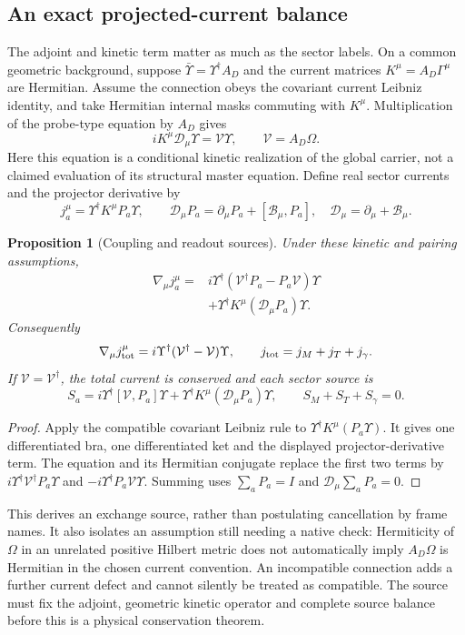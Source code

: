 \documentclass[11pt,a4paper]{article}
\newtheorem{proposition}{Proposition}
\begin{document}
\subsection{An exact projected-current balance}
The adjoint and kinetic term matter as much as the sector labels. On a
common geometric background, suppose
$\bar\Upsilon=\Upsilon^\dagger A_D$ and the current matrices
$K^\mu=A_D\Gamma^\mu$ are Hermitian. Assume the connection obeys the
covariant current Leibniz identity, and take Hermitian internal masks
commuting with $K^\mu$. Multiplication of the probe-type equation by
$A_D$ gives
\[
 iK^\mu\mathcal D_\mu\Upsilon=\mathcal V\Upsilon,
 \qquad \mathcal V=A_D\Omega.
\]
Here this equation is a conditional kinetic realization of the global
carrier, not a claimed evaluation of its structural master equation.
Define real sector currents and the projector derivative by
\[
 j_a^\mu=\Upsilon^\dagger K^\mu P_a\Upsilon,\qquad
 \mathcal D_\mu P_a=\partial_\mu P_a+[\mathcal B_\mu,P_a],
 \quad\mathcal D_\mu=\partial_\mu+\mathcal B_\mu.
\]

\begin{proposition}[Coupling and readout sources]
Under these kinetic and pairing assumptions,
\[
 \begin{aligned}
 \nabla_\mu j_a^\mu={}&
 i\Upsilon^\dagger(\mathcal V^\dagger P_a-P_a\mathcal V)\Upsilon\\
 &+\Upsilon^\dagger K^\mu(\mathcal D_\mu P_a)\Upsilon.
 \end{aligned}
\]
Consequently
\[
 \nabla_\mu j_{\rm tot}^\mu
 =i\Upsilon^\dagger(\mathcal V^\dagger-\mathcal V)\Upsilon,
 \qquad j_{\rm tot}=j_M+j_T+j_\gamma.
\]
If $\mathcal V=\mathcal V^\dagger$, the total current is conserved
and each sector source is
\[
 S_a=i\Upsilon^\dagger[\mathcal V,P_a]\Upsilon
 +\Upsilon^\dagger K^\mu(\mathcal D_\mu P_a)\Upsilon,
 \qquad S_M+S_T+S_\gamma=0.
\]
\end{proposition}
\begin{proof}
Apply the compatible covariant Leibniz rule to
$\Upsilon^\dagger K^\mu(P_a\Upsilon)$. It gives one differentiated
bra, one differentiated ket and the displayed projector-derivative
term. The equation and its Hermitian conjugate replace the first two
terms by $i\Upsilon^\dagger\mathcal V^\dagger P_a\Upsilon$ and
$-i\Upsilon^\dagger P_a\mathcal V\Upsilon$. Summing uses
$\sum_aP_a=I$ and $\mathcal D_\mu\sum_aP_a=0$.
\end{proof}

This derives an exchange source, rather than postulating cancellation
by frame names. It also isolates an assumption still needing a native
check: Hermiticity of $\Omega$ in an unrelated positive Hilbert metric
does not automatically imply $A_D\Omega$ is Hermitian in the chosen
current convention. An incompatible connection adds a further current
defect and cannot silently be treated as compatible. The source must
fix the adjoint, geometric kinetic operator and complete source balance
before this is a physical conservation theorem.
\end{document}
